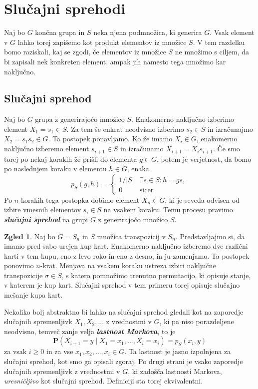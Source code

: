 \documentclass[11pt]{book}
\def\PP{\mathbf{P}}
\def\definicija{\color{rdeca}\bf\em}
\theoremstyle{definition}
\theoremstyle{zgled}
\newtheorem*{zgled}{Zgled}
\theoremstyle{odprtproblem}
\theoremstyle{domacanaloga}
\theoremstyle{izrek}
\begin{document}
\section{Slučajni sprehodi}

Naj bo $G$ končna grupa in $S$ neka njena podmnožica, ki generira $G$. Vsak element v $G$ lahko torej zapišemo kot produkt elementov iz množice $S$. V tem razdelku bomo raziskali, kaj se zgodi, če elementov iz množice $S$ ne množimo s ciljem, da bi zapisali nek konkreten element, ampak jih namesto tega množimo kar naključno. 

\subsection{Slučajni sprehod}

Naj bo $G$ grupa z generirajočo množico $S$. Enakomerno naključno izberimo element $X_1 = s_1 \in S$. Za tem še enkrat neodvisno izberimo $s_2 \in S$ in izračunajmo $X_2 = s_1 s_2 \in G$. Ta postopek ponavljamo. Ko že imamo $X_i \in G$, enakomerno naključno izberemo element $s_{i+1} \in S$ in izračunamo $X_{i+1} = X_i s_{i+1}$. Če smo torej po nekaj korakih že prišli do elementa $g \in G$, potem je verjetnost, da bomo po naslednjem koraku v elementu $h \in G$, enaka 
\[
p_S(g, h)
    = \begin{cases}
        1/|S| & \exists s \in S \colon h = g s, \\
        0 & \text{sicer}
    \end{cases}
\]
Po $n$ korakih tega postopka dobimo element $X_n \in G$, ki je seveda odvisen od izbire vmesnih elementov $s_i \in S$ na vsakem koraku. Temu procesu pravimo {\definicija slučajni sprehod} na grupi $G$ z generirajočo množico $S$. 


\begin{zgled}
Naj bo $G = S_n$ in $S$ množica transpozicij v $S_n$. Predstavljajmo si, da imamo pred sabo urejen kup kart. Enakomerno naključno izberemo dve različni karti v tem kupu, eno z levo roko in eno z desno, in ju zamenjamo. Ta postopek ponovimo $n$-krat. Menjava na vsakem koraku ustreza izbiri naključne transpozicije $\sigma \in S$, s katero pomnožimo trenutno permutacijo, ki opisuje stanje, v katerem je kup kart. Slučajni sprehod v tem primeru torej opisuje slučajno mešanje kupa kart.
\end{zgled}

Nekoliko bolj abstraktno bi lahko na slučajni sprehod gledali kot na zaporedje slučajnih spremenljivk $X_1, X_2, \dots$ z vrednostmi v $G$, ki pa niso porazdeljene neodvisno, temveč zanje velja {\definicija lastnost Markova}, to je
\[
    \PP( X_{i+1} = y \mid X_1 = x_1, \dots, X_i = x_i)
    = p_S(x_i, y)
\]
za vsak $i \geq 0$ in za vse $x_1, x_2, \dots, x_i \in G$. Ta lastnost je jasno izpolnjena za slučajni sprehod, kot smo ga opisali zgoraj. Po drugi strani je vsako zaporedje slučajnih spremenljivk z vrednostmi v $G$, ki zadošča lastnosti Markova, \emph{uresničljivo} kot slučajni sprehod. Definiciji sta torej ekvivalentni.
\end{document}
